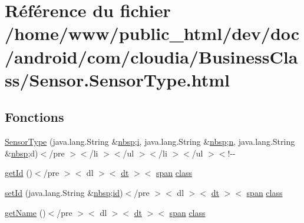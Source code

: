 \hypertarget{_sensor_8_sensor_type_8html}{\section{Référence du fichier /home/www/public\-\_\-html/dev/doc/android/com/cloudia/\-Business\-Class/\-Sensor.Sensor\-Type.\-html}
\label{_sensor_8_sensor_type_8html}
}
\subsection*{Fonctions}
\begin{DoxyCompactItemize}
\item 
\hyperlink{_sensor_8_sensor_type_8html_ad47eca7a2a8b633e38436ecd72b67b0d}{Sensor\-Type} (java.\-lang.\-String \&\hyperlink{_tools_8html_aef915316f784c9063d942974538301a6}{nbsp};\hyperlink{_login_activity_8html_a7e98b8a17c0aad30ba64d47b74e2a6c1}{i}, java.\-lang.\-String \&\hyperlink{_tools_8html_aef915316f784c9063d942974538301a6}{nbsp};\hyperlink{_sensor_8_sensor_type_8html_aeab71244afb687f16d8c4f5ee9d6ef0e}{n}, java.\-lang.\-String \&\hyperlink{_tools_8html_aef915316f784c9063d942974538301a6}{nbsp};d)$<$/pre $>$$<$/li $>$$<$/ul $>$$<$/li $>$$<$/ul $>$$<$!-\/-\/
\item 
\hyperlink{_sensor_8_sensor_type_8html_ab3a0e513db813f22df2ca23e118d35a9}{get\-Id} ()$<$/pre $>$$<$ dl $>$$<$ \hyperlink{stylesheet_8css_a107565fb4039d33b041380d6e0ea1d80}{dt} $>$$<$ \hyperlink{stylesheet_8css_a8343996ebcf16220b04e54659aac31cc}{span} \hyperlink{_tools_8html_acf06f836132665ba8114f5a414c2403f}{class}
\item 
\hyperlink{_sensor_8_sensor_type_8html_a22720539ad9bd3e4500a4ffcd7a3b702}{set\-Id} (java.\-lang.\-String \&\hyperlink{_tools_8html_aef915316f784c9063d942974538301a6}{nbsp};\hyperlink{index-9_8html_aa9b8ff1d03b739d1e752b9d9a5aa7c98}{id})$<$/pre $>$$<$ dl $>$$<$ \hyperlink{stylesheet_8css_a107565fb4039d33b041380d6e0ea1d80}{dt} $>$$<$ \hyperlink{stylesheet_8css_a8343996ebcf16220b04e54659aac31cc}{span} \hyperlink{_tools_8html_acf06f836132665ba8114f5a414c2403f}{class}
\item 
\hyperlink{_sensor_8_sensor_type_8html_aa32a9cfdf72a88fdec3470b4a9fb1517}{get\-Name} ()$<$/pre $>$$<$ dl $>$$<$ \hyperlink{stylesheet_8css_a107565fb4039d33b041380d6e0ea1d80}{dt} $>$$<$ \hyperlink{stylesheet_8css_a8343996ebcf16220b04e54659aac31cc}{span} \hyperlink{_tools_8html_acf06f836132665ba8114f5a414c2403f}{class}

\end{DoxyCompactItemize}
